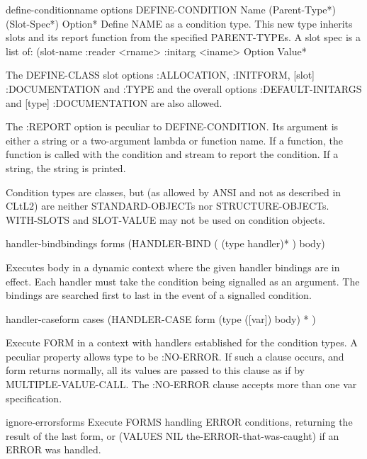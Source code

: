 \begin{macro}{define-condition}{name \rest \rest \body options}{}{}
  DEFINE-CONDITION Name (Parent-Type*) (Slot-Spec*) Option*
   Define NAME as a condition type. This new type inherits slots and its
   report function from the specified PARENT-TYPEs. A slot spec is a list of:
     (slot-name :reader <rname> :initarg <iname> {Option Value}*

   The DEFINE-CLASS slot options :ALLOCATION, :INITFORM, [slot] :DOCUMENTATION
   and :TYPE and the overall options :DEFAULT-INITARGS and
   [type] :DOCUMENTATION are also allowed.

   The :REPORT option is peculiar to DEFINE-CONDITION. Its argument is either
   a string or a two-argument lambda or function name. If a function, the
   function is called with the condition and stream to report the condition.
   If a string, the string is printed.

   Condition types are classes, but (as allowed by ANSI and not as described in
   CLtL2) are neither STANDARD-OBJECTs nor STRUCTURE-OBJECTs. WITH-SLOTS and
   SLOT-VALUE may not be used on condition objects.
\end{macro}

\begin{macro}{handler-bind}{bindings \body forms}{}{}
  (HANDLER-BIND ( {(type handler)}* )  body)

Executes body in a dynamic context where the given handler bindings are in
effect. Each handler must take the condition being signalled as an argument.
The bindings are searched first to last in the event of a signalled
condition.
\end{macro}

\begin{macro}{handler-case}{form \rest cases}{}{}
  (HANDLER-CASE form { (type ([var]) body) }* )

Execute FORM in a context with handlers established for the condition types. A
peculiar property allows type to be :NO-ERROR. If such a clause occurs, and
form returns normally, all its values are passed to this clause as if by
MULTIPLE-VALUE-CALL. The :NO-ERROR clause accepts more than one var
specification.
\end{macro}

\begin{macro}{ignore-errors}{\rest forms}{}{}
  Execute FORMS handling ERROR conditions, returning the result of the last
  form, or (VALUES NIL the-ERROR-that-was-caught) if an ERROR was handled.
\end{macro}

